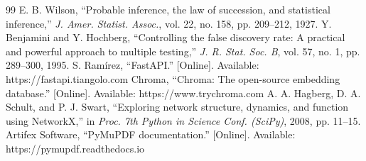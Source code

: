 \documentclass[conference]{IEEEtran}
\begin{document}
\begin{thebibliography}{99}
 E. B. Wilson, ``Probable inference, the law of succession, and statistical inference,'' \emph{J. Amer. Statist. Assoc.}, vol. 22, no. 158, pp. 209--212, 1927.
 Y. Benjamini and Y. Hochberg, ``Controlling the false discovery rate: A practical and powerful approach to multiple testing,'' \emph{J. R. Stat. Soc. B}, vol. 57, no. 1, pp. 289--300, 1995.
 S. Ram{\'i}rez, ``{FastAPI}.'' [Online]. Available: https://fastapi.tiangolo.com
 Chroma, ``Chroma: The open-source embedding database.'' [Online]. Available: https://www.trychroma.com
 A. A. Hagberg, D. A. Schult, and P. J. Swart, ``Exploring network structure, dynamics, and function using {NetworkX},'' in \emph{Proc. 7th Python in Science Conf. (SciPy)}, 2008, pp. 11--15.
 Artifex Software, ``{PyMuPDF} documentation.'' [Online]. Available: https://pymupdf.readthedocs.io
\end{thebibliography}
\end{document}
